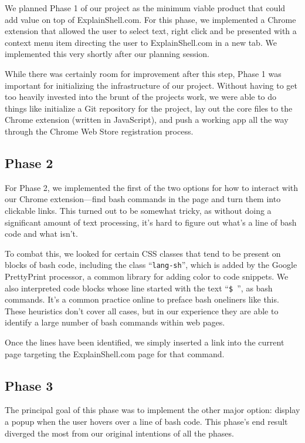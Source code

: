 \documentclass[11pt]{article}
\begin{document}
We planned Phase 1 of our project as the minimum viable product that could add
value on top of ExplainShell.com. For this phase, we implemented a Chrome
extension that allowed the user to select text, right click and be presented
with a context menu item directing the user to ExplainShell.com in a new tab.
We implemented this very shortly after our planning session.

While there was certainly room for improvement after this step, Phase 1 was
important for initializing the infrastructure of our project. Without having to
get too heavily invested into the brunt of the projects work, we were able to do
things like initialize a Git repository for the project, lay out the core files
to the Chrome extension (written in JavaScript), and push a working app all the
way through the Chrome Web Store registration process.

\subsection{Phase 2}

For Phase 2, we implemented the first of the two options for how to interact
with our Chrome extension---find bash commands in the page and turn them into
clickable links. This turned out to be somewhat tricky, as without doing a
significant amount of text processing, it's hard to figure out what's a line
of bash code and what isn't.

To combat this, we looked for certain CSS classes that tend to be present on
blocks of bash code, including the class ``\texttt{lang-sh}'', which is added
by the Google PrettyPrint processor, a common library for adding color to code
snippets. We also interpreted code blocks whose line started with the text
``\texttt{\$ }'', as bash commands. It's a common practice online to preface
bash oneliners like this. These heuristics don't cover all cases, but in our
experience they are able to identify a large number of bash commands within web
pages.

Once the lines have been identified, we simply inserted a link into the current
page targeting the ExplainShell.com page for that command.

\subsection{Phase 3}

The principal goal of this phase was to implement the other major option:
display a popup when the user hovers over a line of bash code. This phase's end
result diverged the most from our original intentions of all the phases.
\end{document}
